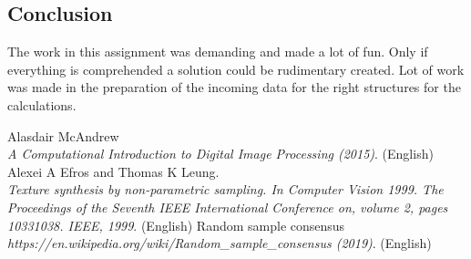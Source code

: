 \documentclass[12pt]{article}
\begin{document}
\subsection{Conclusion}
The work in this assignment was demanding and made a lot of fun. Only if everything is comprehended a solution could be rudimentary created. Lot of work was made in the preparation of the incoming data for the right structures for the calculations.


\begin{thebibliography}{1}
  Alasdair McAndrew
  \\\textit{A Computational Introduction to Digital Image Processing (2015)}. (English)  
  Alexei A Efros and Thomas K Leung.
  \\\textit{Texture synthesis by non-parametric sampling. In Computer Vision 1999. The Proceedings of the Seventh IEEE International Conference on, volume 2, pages 10331038. IEEE, 1999}. (English)
  Random sample consensus
  \\\textit{https://en.wikipedia.org/wiki/Random\_sample\_consensus (2019)}. (English)  
\end{thebibliography}
\end{document}
